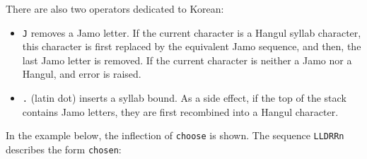 \noindent There are also two operators dedicated to Korean:
\begin{itemize}
    \item \verb+J+ removes a Jamo letter. If the current character is a Hangul
    syllab character, this character is first replaced by the equivalent Jamo
    sequence, and then, the last Jamo letter is removed. If the current
    character is neither a Jamo nor a Hangul, and error is raised.
    
    \item \verb+.+ (latin dot) inserts a syllab bound. As a side effect, if the
    top of the stack contains Jamo letters, they are first recombined into a
    Hangul character.
    \end{itemize}


\bigskip
\noindent In the example below, the inflection of \verb+choose+ is
shown. The sequence \verb+LLDRRn+ describes the form \verb+chosen+:

